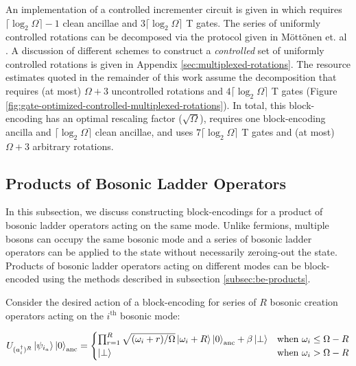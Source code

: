 An implementation of a controlled incrementer circuit is given in \cite{Gidney_2015} which requires $\lceil \log_2\Omega \rceil - 1$ clean ancillae and $3 \lceil \log_2\Omega \rceil$ T gates.
The series of uniformly controlled rotations can be decomposed via the protocol given in Möttönen et. al \cite{mottonen2004transformation}.
A discussion of different schemes to construct a \textit{controlled} set of uniformly controlled rotations is given in Appendix \ref{sec:multiplexed-rotations}.
The resource estimates quoted in the remainder of this work assume the decomposition that requires (at most) $\Omega + 3$ uncontrolled rotations and $4 \lceil{\log_2{\Omega}}\rceil$ T gates (Figure \ref{fig:gate-optimized-controlled-multiplexed-rotations}).
In total, this block-encoding has an optimal rescaling factor ($\sqrt{\Omega}$), requires one block-encoding ancilla and $\lceil{\log_2{\Omega}}\rceil$ clean ancillae, and uses $7 \lceil \log_2\Omega \rceil$ T gates and (at most) $\Omega + 3$ arbitrary rotations.


\subsection{Products of Bosonic Ladder Operators}

In this subsection, we discuss constructing block-encodings for a product of bosonic ladder operators acting on the same mode.
Unlike fermions, multiple bosons can occupy the same bosonic mode and a series of bosonic ladder operators can be applied to the state without necessarily zeroing-out the state.
Products of bosonic ladder operators acting on different modes can be block-encoded using the methods described in subsection \ref{subsec:be-products}.

Consider the desired action of a block-encoding for series of $R$ bosonic creation operators acting on the $i^\text{th}$ bosonic mode:
\begin{widetext}
\begin{equation}
    \label{eq:be-S-creation-ops}
    \begin{split}
        U_{(a^\dagger_i)^R} \ket{\psi_{i_a}} \ket{0}_\text{anc} =
        \begin{cases}
            \prod_{r=1}^{R} \sqrt{(\omega_i + r) / \Omega} \ket{\omega_i + R} \ket{0}_\text{anc} + \beta \ket{\perp} & \text{when } \omega_i \leq \Omega - R \\
            \ket{\perp} & \text{when } \omega_i > \Omega - R \\
        \end{cases}
    \end{split}
\end{equation}
\end{widetext}

